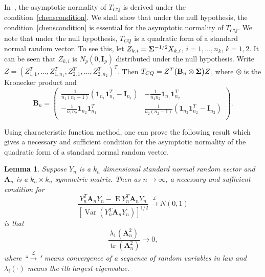 \documentclass[3p]{elsarticle}
\DeclareMathOperator{\mytr}{tr}
\DeclareMathOperator{\myE}{E}
\DeclareMathOperator{\myVar}{Var}
\newcommand{\BA}{\mathbf{A}}    \newcommand{\BB}{\mathbf{B}}    \newcommand{\BC}{\mathbf{C}}    \newcommand{\BD}{\mathbf{D}}    \newcommand{\BE}{\mathbf{E}}    \newcommand{\BF}{\mathbf{F}}    \newcommand{\BG}{\mathbf{G}}    \newcommand{\BH}{\mathbf{H}}    \newcommand{\BI}{\mathbf{I}}    \newcommand{\BJ}{\mathbf{J}}    \newcommand{\BK}{\mathbf{K}}    \newcommand{\BL}{\mathbf{L}}
\theoremstyle{plain}
\newtheorem{lemma}{\quad\quad Lemma}
\theoremstyle{definition}
\theoremstyle{remark}
\begin{document}
    In~\cite{Chen2010A}, the asymptotic normality of $T_{CQ}$ is derived under the condition~\eqref{chenscondition}.
    We shall show that under the null hypothesis, the condition~\eqref{chenscondition} is essential for the asymptotic normality of $T_{CQ}$.
We note that under the null hypothesis, $T_{CQ}$ is a quadratic form of a standard normal random vector.
To see this,
let $Z_{k,i}=\boldsymbol{\Sigma}^{-1/2}X_{k,i}$, $i=1,\ldots,n_k$, $k=1,2$.
It can be seen that $Z_{k,i}$ is $ N_p(0,\BI_{p})$ distributed under the null hypothesis.
Write $Z=(Z_{1,1}^T,\ldots,Z_{1,n_1}^T,Z_{2,1}^T,\ldots,Z_{2,n_2}^T)^T$.
    Then 
        $
        T_{CQ}=Z^T \big( \BB_n\otimes \bSigma \big) Z
        $,
    where $\otimes$ is the Kronecker product and
    \begin{equation*}
        \BB_n=\begin{pmatrix}
            \frac{1}{n_1(n_1-1)}(\mathbf{1}_{n_1} \mathbf{1}_{n_1}^T-\BI_{n_1})&
            -\frac{1}{n_1 n_2}\mathbf{1}_{n_1} \mathbf{1}_{n_2}^T\\
            -\frac{1}{n_1 n_2}\mathbf{1}_{n_2} \mathbf{1}_{n_1}^T&
            \frac{1}{n_2(n_2-1)}( \mathbf{1}_{n_2} \mathbf{1}_{n_2}^T-\BI_{n_2})\\
        \end{pmatrix}.
    \end{equation*}
    
Using characteristic function method, one can prove the following result which gives a necessary and sufficient condition for the asymptotic normality of the quadratic form of a standard normal random vector.
\begin{lemma}\label{quadraticFormCLT}
    Suppose $Y_{n}$ is a $k_n$ dimensional standard normal random vector and $\BA_n$ is a $k_n\times k_n$ symmetric matrix. Then as $n\to \infty$, a necessary and sufficient condition for
    \begin{equation}\label{quadratic}
        \frac{Y_n^T \BA_n Y_n-\myE Y_n^T \BA_n Y_n}{{[\myVar (Y_n^T \BA_n Y_n)]}^{1/2}}\xrightarrow{\mathcal{L}}N(0,1)
    \end{equation}
    is that
    \begin{equation}\label{quadraticEigen}
        \frac{\lambda_{1}(\BA_n^2)}{\mytr(\BA_n^2)}\to 0,
    \end{equation}
    where ``$\xrightarrow{\mathcal{L}}$" means convergence of a sequence of random variables in law and $\lambda_{i}(\cdot)$ means the $i$th largest eigenvalue.
\end{lemma}
\end{document}
